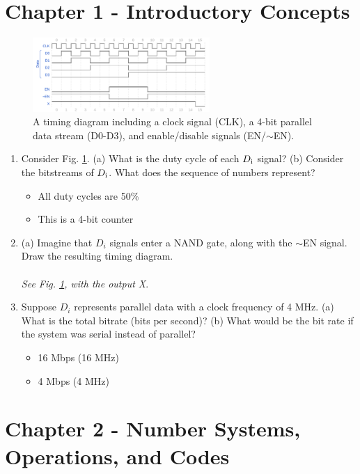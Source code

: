 \documentclass[10pt]{article}
\begin{document}
\maketitle

\section{Chapter 1 - Introductory Concepts}
\begin{figure}[ht]
\centering
\includegraphics[width=0.6\textwidth]{timingExample7a.pdf}
\caption{\label{fig:timing7} A timing diagram including a clock signal (CLK), a 4-bit parallel data stream (D0-D3), and enable/disable signals (EN/$\sim$EN).}
\end{figure}
\begin{enumerate}
\item Consider Fig. \ref{fig:timing7}. (a) What is the duty cycle of each $D_{\rm i}$ signal? (b) Consider the bitstreams of $D_{\rm i}$.  What does the sequence of numbers represent?
\begin{itemize}
\item All duty cycles are 50\%
\item This is a 4-bit counter
\end{itemize}
\item (a) Imagine that $D_i$ signals enter a NAND gate, along with the $\sim$EN signal.  Draw the resulting timing diagram. \\ \\
\textit{See Fig. \ref{fig:timing7}, with the output X}.
\item Suppose $D_i$ represents parallel data with a clock frequency of 4 MHz.  (a) What is the total bitrate (bits per second)?  (b) What would be the bit rate if the system was serial instead of parallel?
\begin{itemize}
\item 16 Mbps (16 MHz)
\item 4 Mbps (4 MHz)
\end{itemize}
\end{enumerate}

\section{Chapter 2 - Number Systems, Operations, and Codes}
\end{document}
